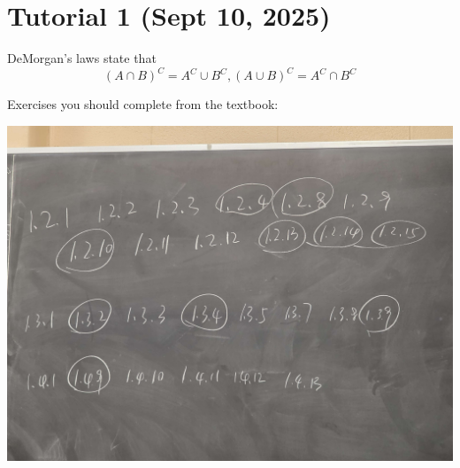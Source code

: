 \section{Tutorial 1 (Sept 10, 2025)}
DeMorgan's laws state that
\[
(A \cap B)^C = A^C \cup B^C, (A \cup B)^C = A^C \cap B^C
\]

\noindent Exercises you should complete from the textbook:

\includegraphics{sta257/figures/tut1problems.jpg}

